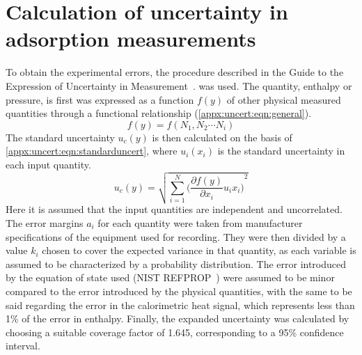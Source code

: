 
\graphicspath{ {\thisappx/figures/} }

\chapter{Calculation of uncertainty in adsorption measurements}%
\label{appx:errors}

To obtain the experimental errors, the procedure described in 
the Guide to the Expression of Uncertainty in 
Measurement~\cite{EvaluationMeasurementData2008}.
was used. The quantity, enthalpy or pressure, is first was expressed
as a function \(f(y)\) of other physical measured quantities through a
functional relationship (\autoref{appx:uncert:eqn:general}).
%
\begin{equation}\label{appx:uncert:eqn:general}
    f(y)=f(N_1,N_2 \cdots N_i)
\end{equation}
%
The standard uncertainty \(u_c (y)\)
is then calculated on the basis of \autoref{appx:uncert:eqn:standarduncert},
where \(u_i (x_i)\) is the standard uncertainty in each input quantity.
%
\begin{equation}\label{appx:uncert:eqn:standarduncert}
    u_c(y) = \sqrt{ \sum_{i=1}^N {\Big( \frac{\partial f(y)}{\partial x_i} u_i x_i  \Big)}^2 }
\end{equation}
%
Here it is assumed 
that the input quantities are independent and uncorrelated. 
The error margins \(a_i\) for each quantity were taken from manufacturer 
specifications of the equipment used for recording. They were then divided
by a value \(k_i\) chosen to cover the expected variance in that quantity,
as each variable is assumed to be characterized by a probability 
distribution. The error introduced by the equation of state used 
(NIST REFPROP~\cite{lemmonNISTReferenceFluid1989}) were assumed to
be minor compared to the error 
introduced by the physical quantities, with the same to be 
said regarding the error in the calorimetric heat signal, which 
represents less than 1\% of the error in enthalpy. Finally, the expanded 
uncertainty was calculated by choosing a suitable coverage factor of
1.645, corresponding to a 95\% confidence interval.



